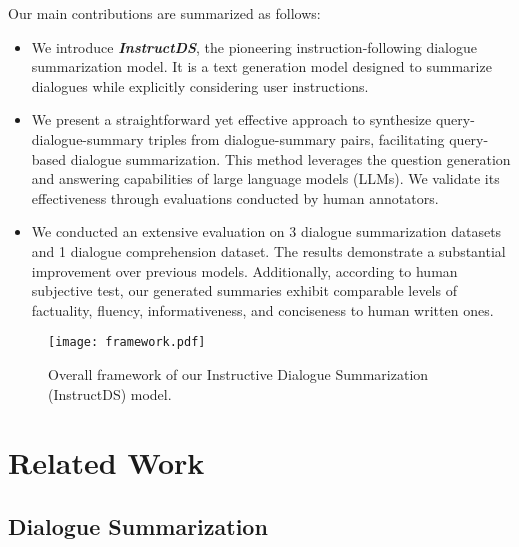 \documentclass[11pt]{article}
\begin{document}
    Our main contributions are summarized as follows:
    \begin{itemize}
        \item We introduce \textbf{\emph{InstructDS}}, the pioneering instruction-following dialogue summarization model. It is a text generation model designed to summarize dialogues while explicitly considering user instructions.
        
        \item We present a straightforward yet effective approach to synthesize query-dialogue-summary triples from dialogue-summary pairs, facilitating query-based dialogue summarization. This method leverages the question generation and answering capabilities of large language models (LLMs). We validate its effectiveness through evaluations conducted by human annotators.
        

        \item We conducted an extensive evaluation on 3 dialogue summarization datasets and 1 dialogue comprehension dataset. The results demonstrate a substantial improvement over previous models. Additionally, according to human subjective test, our generated summaries exhibit comparable levels of factuality, fluency, informativeness, and conciseness to human written ones.

        
    \end{itemize}
    

\begin{figure*}[t]
        \centering
         \texttt{[image: framework.pdf]}
        \caption{Overall framework of our Instructive Dialogue Summarization (InstructDS) model. 
        }
        \label{fig:framework}
    \end{figure*}



\section{Related Work}

    \subsection{Dialogue Summarization}
\end{document}
